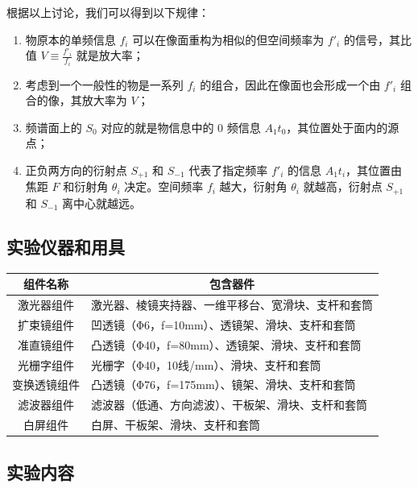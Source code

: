 \documentclass[zihao=5, UTF8]{article}
\theoremstyle{MyLineTheoremStyle} %
\theoremstyle{MyBlockTheoremStyle} %
\theoremstyle{MySubsubsectionStyle} %
\begin{document}
根据以上讨论，我们可以得到以下规律：

\begin{enumerate}
    \item 物原本的单频信息 $f_i$ 可以在像面重构为相似的但空间频率为 $f'_i$ 的信号，其比值 $V \equiv \frac{f'_i}{f_i}$ 就是放大率；
    
    \item 考虑到一个一般性的物是一系列 $f_i$ 的组合，因此在像面也会形成一个由 $f'_i$ 组合的像，其放大率为 $V$；
    
    \item 频谱面上的 $S_0$ 对应的就是物信息中的 0 频信息 $A_1 t_0$，其位置处于面内的源点；
    
    \item 正负两方向的衍射点 $S_{+1}$ 和 $S_{-1}$ 代表了指定频率 $f'_i$ 的信息 $A_1 t_i$，其位置由焦距 $F$ 和衍射角 $\theta_i$ 决定。空间频率 $f_i$ 越大，衍射角 $\theta_i$ 就越高，衍射点 $S_{+1}$ 和 $S_{-1}$ 离中心就越远。
\end{enumerate}


\subsection{实验仪器和用具}

\begin{center}
\begin{tabular}{|c|l|}
\hline
\textbf{组件名称} & \multicolumn{1}{c|}{\textbf{包含器件}} \\
\hline
激光器组件 & 激光器、棱镜夹持器、一维平移台、宽滑块、支杆和套筒 \\
\hline
扩束镜组件 & 凹透镜（Φ6，f=10mm）、透镜架、滑块、支杆和套筒 \\
\hline
准直镜组件 & 凸透镜（Φ40，f=80mm）、透镜架、滑块、支杆和套筒 \\
\hline
光栅字组件 & 光栅字（Φ40，10线/mm）、滑块、支杆和套筒 \\
\hline
变换透镜组件 & 凸透镜（Φ76，f=175mm）、镜架、滑块、支杆和套筒 \\
\hline
滤波器组件 & 滤波器（低通、方向滤波）、干板架、滑块、支杆和套筒 \\
\hline
白屏组件 & 白屏、干板架、滑块、支杆和套筒 \\
\hline
\end{tabular}
\end{center}


\subsection{实验内容}
\end{document}
